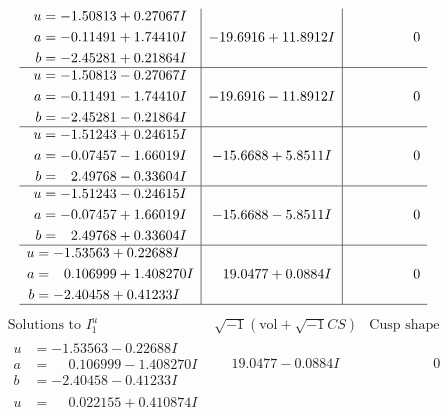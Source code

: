 \documentclass[1p]{elsarticle_modified}
\theoremstyle{definition}
\newcommand{\I}{\sqrt{-1}}
\begin{document}
$$\begin{array}{c|c|c}
\begin{aligned}
u &= -1.50813 + 0.27067 I \\
a &= -0.11491 + 1.74410 I \\
b &= -2.45281 + 0.21864 I\end{aligned}
 & -19.6916 + 11.8912 I & \phantom{-0.000000 } 0 \\ \hline\begin{aligned}
u &= -1.50813 - 0.27067 I \\
a &= -0.11491 - 1.74410 I \\
b &= -2.45281 - 0.21864 I\end{aligned}
 & -19.6916 - 11.8912 I & \phantom{-0.000000 } 0 \\ \hline\begin{aligned}
u &= -1.51243 + 0.24615 I \\
a &= -0.07457 - 1.66019 I \\
b &= \phantom{-}2.49768 - 0.33604 I\end{aligned}
 & -15.6688 + 5.8511 I & \phantom{-0.000000 } 0 \\ \hline\begin{aligned}
u &= -1.51243 - 0.24615 I \\
a &= -0.07457 + 1.66019 I \\
b &= \phantom{-}2.49768 + 0.33604 I\end{aligned}
 & -15.6688 - 5.8511 I & \phantom{-0.000000 } 0 \\ \hline\begin{aligned}
u &= -1.53563 + 0.22688 I \\
a &= \phantom{-}0.106999 + 1.408270 I \\
b &= -2.40458 + 0.41233 I\end{aligned}
 & \phantom{-}19.0477 + 0.0884 I & \phantom{-0.000000 } 0\\
 \hline 
 \end{array}$$\newpage$$\begin{array}{c|c|c}  
\text{Solutions to }I^u_{1}& \I (\text{vol} + \sqrt{-1}CS) & \text{Cusp shape}\\
 \hline 
\begin{aligned}
u &= -1.53563 - 0.22688 I \\
a &= \phantom{-}0.106999 - 1.408270 I \\
b &= -2.40458 - 0.41233 I\end{aligned}
 & \phantom{-}19.0477 - 0.0884 I & \phantom{-0.000000 } 0 \\ \hline\begin{aligned}
u &= \phantom{-}0.022155 + 0.410874 I \\

\end{aligned}
\end{array}$$
\end{document}
